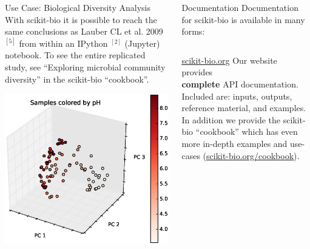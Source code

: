 \documentclass[final,t]{beamer}
\begin{document}
\begin{frame}{}
\begin{columns}[t]
\begin{column}{.3\linewidth}
        \begin{block}{Use Case: Biological Diversity Analysis}
            With scikit-bio it is possible to reach the same conclusions as Lauber CL et al. 2009 $^{[5]}$ from within an IPython $^{[2]}$ (Jupyter) notebook. To see the entire replicated study, see ``Exploring microbial community diversity'' in the scikit-bio ``cookbook''.
            \newline\newline
            \centerline{\includegraphics[width=.6\linewidth]{assets/ordination_out.eps}}\\
        \end{block}


    \end{column}


    \begin{column}{.3\linewidth}
        \begin{block}{Documentation}
            Documentation for scikit-bio is available in many forms:
            \begin{columns}
                \begin{column}{.45\linewidth}
                    \begin{minipage}[c][20cm][c]{\linewidth}
                        \href{http://scikit-bio.org}{\color{blue}\underline{scikit-bio.org}}
                        \newline\newline
                        Our website provides\\ \textbf{complete} API documentation. Included are: inputs, outputs, reference material, and examples. In addition we provide the scikit-bio ``cookbook'' which has even more in-depth examples and use-cases (\href{http://scikit-bio.org/cookbook}{\color{blue}\underline{scikit-bio.org/cookbook}}).


\end{minipage}
\end{column}
\end{columns}
\end{block}
\end{column}
\end{columns}
\end{frame}
\end{document}
